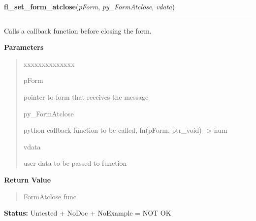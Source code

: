 \hspace{.8\funcindent}\begin{boxedminipage}{\funcwidth}

    \raggedright \textbf{fl\_set\_form\_atclose}(\textit{pForm}, \textit{py\_FormAtclose}, \textit{vdata})

    \vspace{-1.5ex}

    \rule{\textwidth}{0.5\fboxrule}
\setlength{\parskip}{2ex}
    Calls a callback function before closing the form.

\setlength{\parskip}{1ex}
      \textbf{Parameters}
      \vspace{-1ex}

      \begin{quote}
        \begin{Ventry}{xxxxxxxxxxxxxx}

          \item[pForm]

          pointer to form that receives the message

          \item[py\_FormAtclose]

          python callback function to be called, fn(pForm, ptr\_void) 
          -{\textgreater} num

          \item[vdata]

          user data to be passed to function

        \end{Ventry}

      \end{quote}

      \textbf{Return Value}
    \vspace{-1ex}

      \begin{quote}
      FormAtclose func

      \end{quote}

\textbf{Status:} Untested + NoDoc + NoExample = NOT OK



    \end{boxedminipage}

    \label{xformslib:library:fl_set_atclose}

    \vspace{0.5ex}

